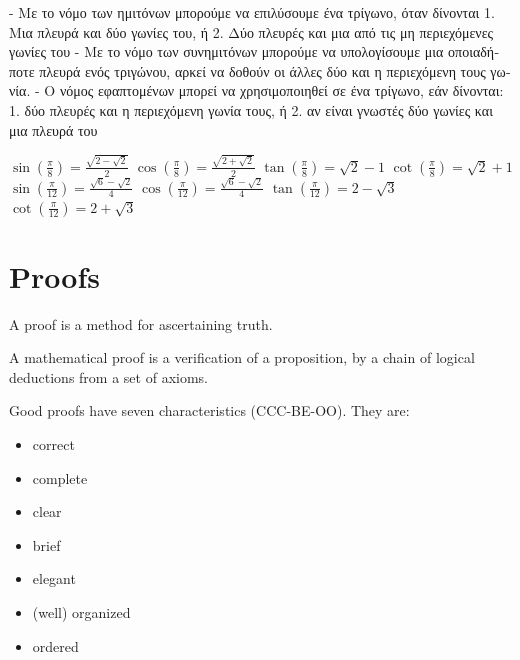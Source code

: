 \documentclass[12pt]{article}
\begin{document}
\begin{flushleft}
	- \textgreek{Με το νόμο των ημιτόνων μπορούμε να επιλύσουμε ένα τρίγωνο, όταν δίνονται 1. Μια πλευρά και δύο γωνίες του, ή 2. Δύο πλευρές και μια από τις μη περιεχόμενες γωνίες του} \linebreak 
	- \textgreek{Με το νόμο των συνημιτόνων μπορούμε να υπολογίσουμε μια οποιαδήποτε πλευρά ενός τριγώνου, αρκεί να δοθούν οι άλλες δύο και η περιεχόμενη τους γωνία.} \linebreak 
	- \textgreek{Ο νόμος εφαπτομένων μπορεί να χρησιμοποιηθεί σε ένα τρίγωνο, εάν δίνονται: 1. δύο πλευρές και η περιεχόμενη γωνία τους, ή 2. αν είναι γνωστές δύο γωνίες και μια πλευρά του} \linebreak 
	
	\textbullet \quad $\displaystyle \sin \left( \frac{\pi}{8} \right) = \frac{\sqrt{2 -\sqrt{2}}}{2} $ \linebreak 
	\textbullet \quad $\displaystyle \cos \left( \frac{\pi}{8} \right) = \frac{\sqrt{2 + \sqrt{2}}}{2} $ \linebreak 
	\textbullet \quad $\displaystyle \tan \left( \frac{\pi}{8} \right) = \sqrt{2} - 1 $ \linebreak 
	\textbullet \quad $\displaystyle \cot \left( \frac{\pi}{8} \right) = \sqrt{2} + 1 $ \linebreak 
	\textbullet \quad $\displaystyle \sin \left( \frac{\pi}{12} \right) = \frac{\sqrt{6} - \sqrt{2}}{4} $ \linebreak 
	\textbullet \quad $\displaystyle \cos \left( \frac{\pi}{12} \right) = \frac{\sqrt{6} - \sqrt{2}}{4} $ \linebreak 
	\textbullet \quad $\displaystyle \tan \left( \frac{\pi}{12} \right) = 2 - \sqrt{3} $ \linebreak 
	\textbullet \quad $\displaystyle \cot \left( \frac{\pi}{12} \right) = 2 + \sqrt{3} $ \linebreak 
	
	
	\pagebreak
	

	\section{Proofs}

	A proof is a method for ascertaining truth. \linebreak 
	
	A mathematical proof is a verification of a proposition, by a chain of logical deductions from a set of axioms. \linebreak 
	
	Good proofs have seven characteristics (CCC-BE-OO). They are:  
	\begin{itemize}
	\item correct
	\item complete
	\item clear 
	\item brief 
	\item elegant
	\item (well) organized
	\item ordered
	\end{itemize}
	

\end{flushleft}
\end{document}
